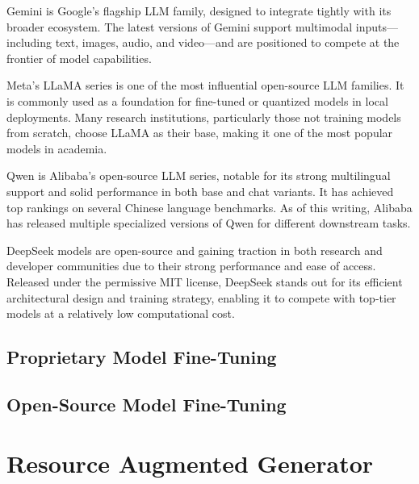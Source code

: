 Gemini is Google’s flagship LLM family, designed to integrate tightly with its broader ecosystem. The latest versions of Gemini support multimodal inputs—including text, images, audio, and video—and are positioned to compete at the frontier of model capabilities.

Meta’s LLaMA series is one of the most influential open-source LLM families. It is commonly used as a foundation for fine-tuned or quantized models in local deployments. Many research institutions, particularly those not training models from scratch, choose LLaMA as their base, making it one of the most popular models in academia.

Qwen is Alibaba’s open-source LLM series, notable for its strong multilingual support and solid performance in both base and chat variants. It has achieved top rankings on several Chinese language benchmarks. As of this writing, Alibaba has released multiple specialized versions of Qwen for different downstream tasks.

DeepSeek models are open-source and gaining traction in both research and developer communities due to their strong performance and ease of access. Released under the permissive MIT license, DeepSeek stands out for its efficient architectural design and training strategy, enabling it to compete with top-tier models at a relatively low computational cost.





\subsection{Proprietary Model Fine-Tuning}

\subsection{Open-Source Model Fine-Tuning}

\section{Resource Augmented Generator}
